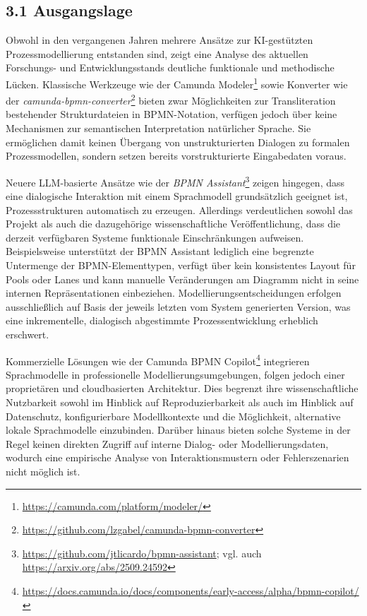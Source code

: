 \documentclass[a4paper,12pt]{scrreprt}
\begin{document}
\subsection*{3.1 Ausgangslage}

Obwohl in den vergangenen Jahren mehrere Ansätze zur KI-gestützten Prozessmodellierung entstanden sind, zeigt eine Analyse des aktuellen Forschungs- und Entwicklungsstands deutliche funktionale und methodische Lücken. Klassische Werkzeuge wie der Camunda Modeler\footnote{\url{https://camunda.com/platform/modeler/}} sowie Konverter wie der \textit{camunda-bpmn-converter}\footnote{\url{https://github.com/lzgabel/camunda-bpmn-converter}} bieten zwar Möglichkeiten zur Transliteration bestehender Strukturdateien in BPMN-Notation, verfügen jedoch über keine Mechanismen zur semantischen Interpretation natürlicher Sprache. Sie ermöglichen damit keinen Übergang von unstrukturierten Dialogen zu formalen Prozessmodellen, sondern setzen bereits vorstrukturierte Eingabedaten voraus.

Neuere LLM-basierte Ansätze wie der \textit{BPMN Assistant}\footnote{\url{https://github.com/jtlicardo/bpmn-assistant}; vgl. auch \url{https://arxiv.org/abs/2509.24592}} zeigen hingegen, dass eine dialogische Interaktion mit einem Sprachmodell grundsätzlich geeignet ist, Prozessstrukturen automatisch zu erzeugen. Allerdings verdeutlichen sowohl das Projekt als auch die dazugehörige wissenschaftliche Veröffentlichung, dass die derzeit verfügbaren Systeme funktionale Einschränkungen aufweisen. Beispielsweise unterstützt der BPMN Assistant lediglich eine begrenzte Untermenge der BPMN-Elementtypen, verfügt über kein konsistentes Layout für Pools oder Lanes und kann manuelle Veränderungen am Diagramm nicht in seine internen Repräsentationen einbeziehen. Modellierungsentscheidungen erfolgen ausschließlich auf Basis der jeweils letzten vom System generierten Version, was eine inkrementelle, dialogisch abgestimmte Prozessentwicklung erheblich erschwert.

Kommerzielle Lösungen wie der Camunda BPMN Copilot\footnote{\url{https://docs.camunda.io/docs/components/early-access/alpha/bpmn-copilot/}} integrieren Sprachmodelle in professionelle Modellierungsumgebungen, folgen jedoch einer proprietären und cloudbasierten Architektur. Dies begrenzt ihre wissenschaftliche Nutzbarkeit sowohl im Hinblick auf Reproduzierbarkeit als auch im Hinblick auf Datenschutz, konfigurierbare Modellkontexte und die Möglichkeit, alternative lokale Sprachmodelle einzubinden. Darüber hinaus bieten solche Systeme in der Regel keinen direkten Zugriff auf interne Dialog- oder Modellierungsdaten, wodurch eine empirische Analyse von Interaktionsmustern oder Fehlerszenarien nicht möglich ist.
\end{document}
